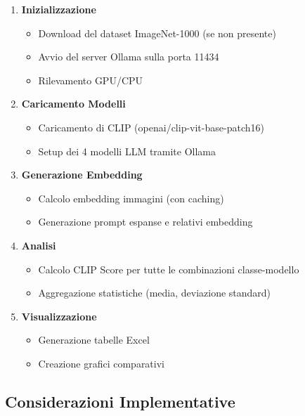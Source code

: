 \documentclass{article}
\begin{document}
\begin{enumerate}
    \item \textbf{Inizializzazione}
    \begin{itemize}
        \item Download del dataset ImageNet-1000 (se non presente)
        \item Avvio del server Ollama sulla porta 11434
        \item Rilevamento GPU/CPU
    \end{itemize}
    
    \item \textbf{Caricamento Modelli}
    \begin{itemize}
        \item Caricamento di CLIP (openai/clip-vit-base-patch16)
        \item Setup dei 4 modelli LLM tramite Ollama
    \end{itemize}
    
    \item \textbf{Generazione Embedding}
    \begin{itemize}
        \item Calcolo embedding immagini (con caching)
        \item Generazione prompt espanse e relativi embedding
    \end{itemize}
    
    \item \textbf{Analisi}
    \begin{itemize}
        \item Calcolo CLIP Score per tutte le combinazioni classe-modello
        \item Aggregazione statistiche (media, deviazione standard)
    \end{itemize}
    
    \item \textbf{Visualizzazione}
    \begin{itemize}
        \item Generazione tabelle Excel
        \item Creazione grafici comparativi
    \end{itemize}
\end{enumerate}

\subsection{Considerazioni Implementative}
\end{document}
